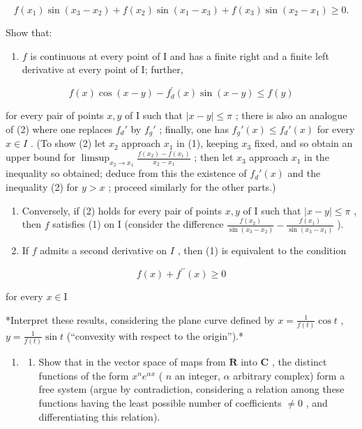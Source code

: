 \[
f \left(x _ {1}\right) \sin \left(x _ {3} - x _ {2}\right) + f \left(x _ {2}\right) \sin \left(x _ {1} - x _ {3}\right) + f \left(x _ {3}\right) \sin \left(x _ {2} - x _ {1}\right) \geqslant 0.\tag{1}
\]

Show that:

\begin{enumerate}
\def\labelenumi{\alph{enumi})}
\tightlist
\item
  \(f\) is continuous at every point of I and has a finite right and a finite left derivative at every point of I; further,
\end{enumerate}

\[
f (x) \cos (x - y) - f _ {d} ^ {\prime} (x) \sin (x - y) \leqslant f (y)\tag{2}
\]

for every pair of points \(x, y\) of I such that \(|x - y| \leqslant \pi\) ; there is also an analogue of (2) where one replaces \(f_d'\) by \(f_g'\) ; finally, one has \(f_g'(x) \leqslant f_d'(x)\) for every \(x \in I\) . (To show (2) let \(x_2\) approach \(x_1\) in (1), keeping \(x_3\) fixed, and so obtain an upper bound for \(\limsup_{x_2 \to x_1} \frac{f(x_2) - f(x_1)}{x_2 - x_1}\) ; then let \(x_3\) approach \(x_1\) in the inequality so obtained; deduce from this the existence of \(f_d'(x)\) and the inequality (2) for \(y > x\) ; proceed similarly for the other parts.)

\begin{enumerate}
\def\labelenumi{\alph{enumi})}
\setcounter{enumi}{1}
\item
  Conversely, if (2) holds for every pair of points \(x, y\) of I such that \(|x - y| \leqslant \pi\) , then \(f\) satisfies (1) on I (consider the difference \(\frac{f(x_2)}{\sin(x_3 - x_2)} - \frac{f(x_1)}{\sin(x_3 - x_1)}\) ).
\item
  If \(f\) admits a second derivative on \(I\) , then (1) is equivalent to the condition
\end{enumerate}

\[
f (x) + f ^ {\prime \prime} (x) \geqslant 0\tag{3}
\]

for every \(x\in \mathrm{I}\)

*Interpret these results, considering the plane curve defined by \(x = \frac{1}{f(t)} \cos t\) , \(y = \frac{1}{f(t)} \sin t\) (``convexity with respect to the origin'').*

\begin{enumerate}
\def\labelenumi{\arabic{enumi})}
\setcounter{enumi}{17}
\tightlist
\item
  \begin{enumerate}
  \def\labelenumii{\alph{enumii})}
  \tightlist
  \item
    Show that in the vector space of maps from \(\mathbf{R}\) into \(\mathbf{C}\) , the distinct functions of the form \(x^n e^{\alpha x}\) ( \(n\) an integer, \(\alpha\) arbitrary complex) form a free system (argue by contradiction, considering a relation among these functions having the least possible number of coefficients \(\neq 0\) , and differentiating this relation).
  \end{enumerate}
\end{enumerate}

